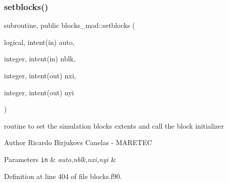 \subsubsection{\texorpdfstring{setblocks()}{setblocks()}}
{\footnotesize\ttfamily subroutine, public blocks\+\_\+mod\+::setblocks (\begin{DoxyParamCaption}\item[{logical, intent(in)}]{auto,  }\item[{integer, intent(in)}]{nblk,  }\item[{integer, intent(out)}]{nxi,  }\item[{integer, intent(out)}]{nyi }\end{DoxyParamCaption})}



routine to set the simulation blocks extents and call the block initializer 

\begin{DoxyAuthor}{Author}
Ricardo Birjukovs Canelas -\/ M\+A\+R\+E\+T\+EC 
\end{DoxyAuthor}

\begin{DoxyParams}[1]{Parameters}
\mbox{\tt in}  & {\em auto,nblk,nxi,nyi} & \\
\hline
\end{DoxyParams}


Definition at line 404 of file blocks.\+f90.


